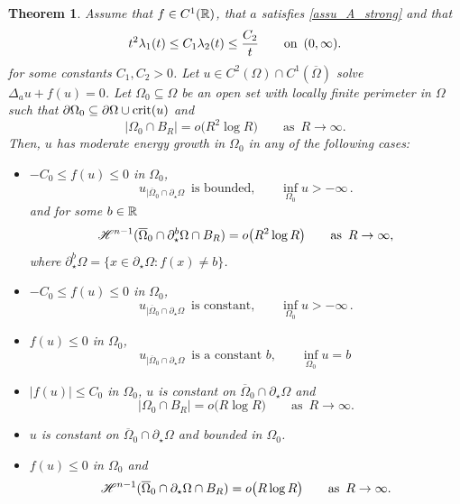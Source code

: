 \documentclass[10 pt,a4paper]{article}
\newtheorem{theorem}[definition]{Theorem}
\theoremstyle{definition}
\begin{document}
\begin{theorem}\label{teo_goodcutoff_MC}
	Assume that  $f \in C^1(\mathbb R)$, that $a$ satisfies \eqref{assu_A_strong} and that
	\[
			\displaystyle t^2 \lambda_1(t) \le C_1 \lambda_2(t) \le \frac{C_2}{t} \qquad \text{on } \, (0, \infty).
	\]
	for some constants $C_1,C_2>0$. Let $u \in C^2(\Omega) \cap C^1(\overline\Omega)$ solve $\Delta_a u + f(u) = 0$. Let $\Omega_0\subseteq\Omega$ be an open set with locally finite perimeter in $\Omega$ such that $\partial\Omega_0 \subseteq \partial\Omega \cup {\rm crit}(u)$ and
	\[
			|\Omega_0 \cap B_R| = o\big( R^2 \log R\big) \qquad \text{as } \, R \to \infty.
	\] 
	Then, $u$ has moderate energy growth in $\Omega_0$ in any of the following cases:
	\begin{itemize}
		\item[(i)] $- C_0 \le f(u) \le 0$ in $\Omega_0$, 
		\[
			u_{|\overline{\Omega}_0 \cap \partial_\star\Omega} \, \text{ is bounded,} \qquad \inf_{\Omega_0} u > -\infty \, .
		\]
		and for some $b \in \mathbb R$ 
		\[
			\mathscr{H}^{n-1}(\overline{\Omega}_0 \cap \partial^b_\star\Omega \cap B_{R}) = o\big( R^2 \log R\big) \qquad \text{as } \, R \to \infty, 
		\]
		where $\partial_\star^b\Omega = \{ x \in \partial_\star \Omega : f(x) \neq b\}$.
		\item[(ii)] $- C_0 \le f(u) \le 0$ in $\Omega_0$, 
		\[
			u_{|\overline{\Omega}_0 \cap \partial_\star\Omega} \, \text{ is constant,} \qquad \inf_{\Omega_0} u > -\infty \, .
		\]
		\item[(iii)] $f(u) \le 0$ in $\Omega_0$, 
		\[
			u_{|\overline{\Omega}_0 \cap \partial_\star\Omega} \, \text{ is a constant $b$,} \qquad \inf_{\Omega_0} u = b\, 
		\]
		\item[(iv)] $|f(u)| \le C_0$ in $\Omega_0$, $u$ is constant on $\overline{\Omega}_0 \cap \partial_\star \Omega$ and 
		\[
			|\Omega_0 \cap B_R| = o\big(R \log R\big) \qquad \text{as } \, R \to \infty.
		\]
		\item[(v)] $u$ is constant on $\overline{\Omega}_0 \cap \partial_\star \Omega$ and bounded in $\Omega_0$.
		\item[(vi)] $f(u) \le 0$ in $\Omega_0$ and 
		\[
			\mathscr{H}^{n-1}(\overline{\Omega}_0 \cap \partial_\star\Omega \cap B_{R}) = o\big(R \log R\big) \qquad \text{as } \, R \to \infty.
		\]
	\end{itemize}			
\end{theorem}

\end{document}
